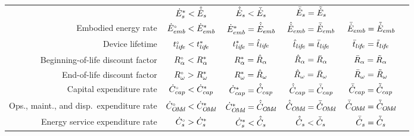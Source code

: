 \begin{landscape}
\begin{table}
\begin{tabular}{r c c c c c}
                                  & ${\dot{E}}^*_s   < \hat{\dot{E}}_s$ 
                                  & $\hat{\dot{E}}_s   < \bar{\dot{E}}_s$ 
                                  & $\bar{\dot{E}}_s = \tilde{\dot{E}}_s$ \\
%
Embodied energy rate              & ${}{\dot{E}}^{\scriptscriptstyle \circ}_{emb}  < {\dot{E}}^*_{emb}$ 
                                  & ${\dot{E}}^*_{emb}   = \hat{\dot{E}}_{emb}$ 
                                  & $\hat{\dot{E}}_{emb}   = \bar{\dot{E}}_{emb}$ 
                                  & $\bar{\dot{E}}_{emb} = \tilde{\dot{E}}_{emb}$ \\
%
Device lifetime                   & ${}{t}^{\scriptscriptstyle \circ}_{li\!f\!e}  < {t}^*_{li\!f\!e}$ 
                                  & ${t}^*_{li\!f\!e}   = \hat{t}_{li\!f\!e}$ 
                                  & $\hat{t}_{li\!f\!e}   = \bar{t}_{li\!f\!e}$ 
                                  & $\bar{t}_{li\!f\!e} = \tilde{t}_{li\!f\!e}$ \\
%
Beginning-of-life discount factor & ${}{R}^{\scriptscriptstyle \circ}_\alpha  < {R}^*_\alpha$ 
                                  & ${R}^*_\alpha   = \hat{R}_\alpha$ 
                                  & $\hat{R}_\alpha   = \bar{R}_\alpha$ 
                                  & $\bar{R}_\alpha = \tilde{R}_\alpha$ \\
%
End-of-life discount factor       & ${}{R}^{\scriptscriptstyle \circ}_\omega  > {R}^*_\omega$
                                  & ${R}^*_\omega   = \hat{R}_\omega$
                                  & $\hat{R}_\omega   = \bar{R}_\omega$
                                  & $\bar{R}_\omega = \tilde{R}_\omega$ \\
%
Capital expenditure rate          & ${}{\dot{C}}^{\scriptscriptstyle \circ}_{cap}  < {\dot{C}}^*_{cap}$ 
                                  & ${\dot{C}}^*_{cap}   = \hat{\dot{C}}_{cap}$ 
                                  & $\hat{\dot{C}}_{cap}   = \bar{\dot{C}}_{cap}$ 
                                  & $\bar{\dot{C}}_{cap} = \tilde{\dot{C}}_{cap}$ \\
%
Ops., maint., and disp.\ expenditure rate & ${}{\dot{C}}^{\scriptscriptstyle \circ}_{O\!M\!d} < {\dot{C}}^*_{O\!M\!d}$ 
                                  & ${\dot{C}}^*_{O\!M\!d}   = \hat{\dot{C}}_{O\!M\!d}$ 
                                  & $\hat{\dot{C}}_{O\!M\!d}   = \bar{\dot{C}}_{O\!M\!d}$ 
                                  & $\bar{\dot{C}}_{O\!M\!d} = \tilde{\dot{C}}_{O\!M\!d}$ \\
%
Energy service expenditure rate   & ${}{\dot{C}}^{\scriptscriptstyle \circ}_s  > {\dot{C}}^*_s$
                                  & ${\dot{C}}^*_s   < \hat{\dot{C}}_s$ 
                                  & $\hat{\dot{C}}_s   < \bar{\dot{C}}_s$ 
                                  & $\bar{\dot{C}}_s = \tilde{\dot{C}}_s$ \\

\end{tabular}
\end{table}
\end{landscape}
